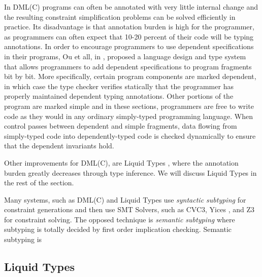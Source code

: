 In DML(C) programs can often be annotated with
very little internal change and the resulting
constraint simplification problems can be solved efficiently
in practice. 
%
Its disadvantage is that annotation burden is high for the programmer,  
as programmers can often expect that 10-20 percent of
their code will be typing annotations.
%
In order to encourage programmers to use dependent specifications in their programs,
Ou et all, in \cite{Ou2004}, proposed a language design and type system that allows programmers to add
dependent specifications to program fragments bit by bit. 
More specifically, certain program components are marked dependent, 
in which case the type checker verifies
statically that the programmer has properly maintained dependent typing annotations.
Other portions of the program are marked simple and in these sections, programmers
are free to write code as they would in any ordinary simply-typed programming language. When control passes between dependent and simple fragments, data flowing
from simply-typed code into dependently-typed code is checked dynamically to ensure that the dependent invariants hold.

Other improvements for DML(C), are Liquid Types \cite{LiquidPLDI08}, 
where the annotation burden greatly decreases through type inference.
We will discuss Liquid Types in the rest of the section.

Many systems, such as DML(C) and Liquid Types use \textit{syntactic subtyping} for constraint 
generations and then use SMT Solvers, such as CVC3\cite{CVC3}, Yices \cite{Yices}, and Z3 \cite{z3}
 for constraint solving.
The opposed technique is \textit{semantic subtyping} where subtyping is totally 
decided by first order implication checking. 
Semantic subtyping is 


%

\subsection{Liquid Types}\label{sec:liquid}

